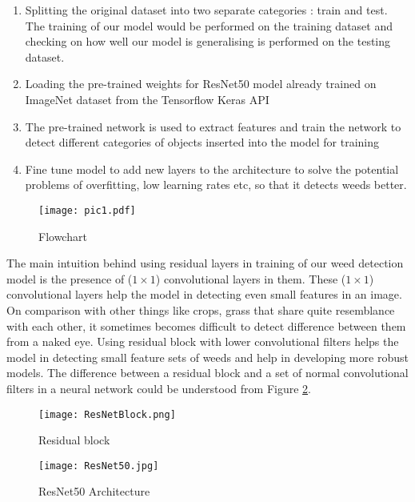 \documentclass{report}
\begin{document}
\begin{enumerate}
	\item Splitting the original dataset into two separate categories : train and test. The training of our model would be performed on the training dataset and checking on how well our model is generalising is performed on the testing dataset. 
	\item Loading the pre-trained weights for ResNet50 model already trained on ImageNet dataset from the Tensorflow Keras API
	\item The pre-trained network is used to extract features and train the network to detect different categories of objects inserted into the model for training 
	\item Fine tune model to add new layers to the architecture to solve the potential problems of overfitting, low learning rates etc, so that it detects weeds better.

\end{enumerate}
\begin{figure}[H]
\centering
\texttt{[image: pic1.pdf]}
\caption{Flowchart}
\label{fig:Flowchart}
\end{figure}

The main intuition behind using residual layers in training of our weed detection model is the presence of ($1 \times 1$) convolutional layers in them. These ($1 \times 1$) convolutional layers help the model in detecting even small features in an image. On comparison with other things like crops, grass that share quite resemblance with each other, it sometimes becomes difficult to detect difference between them from a naked eye. Using residual block with lower convolutional filters helps the model in detecting small feature sets of weeds and help in developing more robust models. The difference between a residual block and a set of normal convolutional filters in a neural network could be understood from Figure \ref{fig:ResidualBlock}. 

\begin{figure}[H]
    \centering
    \texttt{[image: ResNetBlock.png]}
    \caption{Residual block }
    \label{fig:ResidualBlock}
\end{figure}


\begin{figure}[H]
    \centering
    \texttt{[image: ResNet50.jpg]}
    \caption{ResNet50 Architecture}
    \label{fig:ResNet50}
\end{figure}
\end{document}
